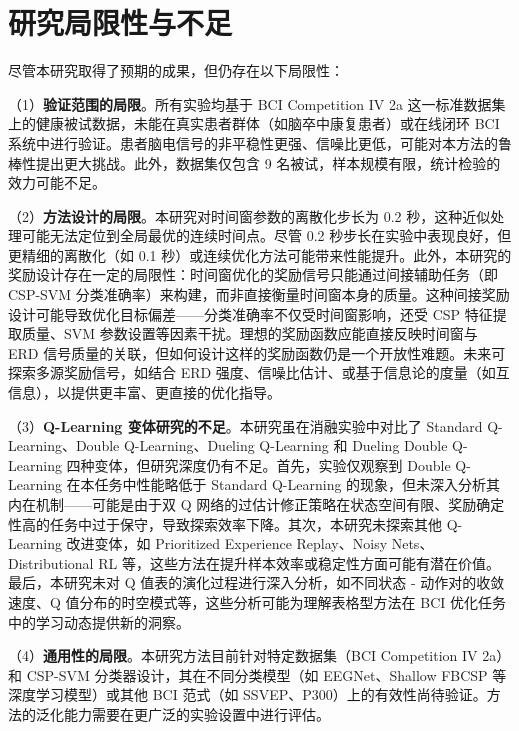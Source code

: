 \section{研究局限性与不足}
\label{sec:limitations}

尽管本研究取得了预期的成果，但仍存在以下局限性：

（1）\textbf{验证范围的局限}。所有实验均基于 BCI Competition IV 2a 这一标准数据集上的健康被试数据，未能在真实患者群体（如脑卒中康复患者）或在线闭环 BCI 系统中进行验证。患者脑电信号的非平稳性更强、信噪比更低，可能对本方法的鲁棒性提出更大挑战。此外，数据集仅包含 9 名被试，样本规模有限，统计检验的效力可能不足。

（2）\textbf{方法设计的局限}。本研究对时间窗参数的离散化步长为 0.2 秒，这种近似处理可能无法定位到全局最优的连续时间点。尽管 0.2 秒步长在实验中表现良好，但更精细的离散化（如 0.1 秒）或连续优化方法可能带来性能提升。此外，本研究的奖励设计存在一定的局限性：时间窗优化的奖励信号只能通过间接辅助任务（即 CSP-SVM 分类准确率）来构建，而非直接衡量时间窗本身的质量。这种间接奖励设计可能导致优化目标偏差——分类准确率不仅受时间窗影响，还受 CSP 特征提取质量、SVM 参数设置等因素干扰。理想的奖励函数应能直接反映时间窗与 ERD 信号质量的关联\cite{pfurtscheller1999event}，但如何设计这样的奖励函数仍是一个开放性难题。未来可探索多源奖励信号，如结合 ERD 强度、信噪比估计、或基于信息论的度量（如互信息），以提供更丰富、更直接的优化指导。

（3）\textbf{Q-Learning 变体研究的不足}。本研究虽在消融实验中对比了 Standard Q-Learning、Double Q-Learning、Dueling Q-Learning 和 Dueling Double Q-Learning 四种变体，但研究深度仍有不足。首先，实验仅观察到 Double Q-Learning 在本任务中性能略低于 Standard Q-Learning 的现象，但未深入分析其内在机制——可能是由于双 Q 网络的过估计修正策略在状态空间有限、奖励确定性高的任务中过于保守，导致探索效率下降。其次，本研究未探索其他 Q-Learning 改进变体，如 Prioritized Experience Replay\cite{schaul2015prioritized}、Noisy Nets\cite{fortunato2018noisy}、Distributional RL\cite{bellemare2017distributional} 等，这些方法在提升样本效率或稳定性方面可能有潜在价值。最后，本研究未对 Q 值表的演化过程进行深入分析，如不同状态 - 动作对的收敛速度、Q 值分布的时空模式等，这些分析可能为理解表格型方法在 BCI 优化任务中的学习动态提供新的洞察。

（4）\textbf{通用性的局限}。本研究方法目前针对特定数据集（BCI Competition IV 2a）和 CSP-SVM 分类器设计，其在不同分类模型（如 EEGNet\cite{lawhern2018eegnet}、Shallow FBCSP\cite{ang2008filter} 等深度学习模型）或其他 BCI 范式（如 SSVEP、P300）上的有效性尚待验证。方法的泛化能力需要在更广泛的实验设置中进行评估。

